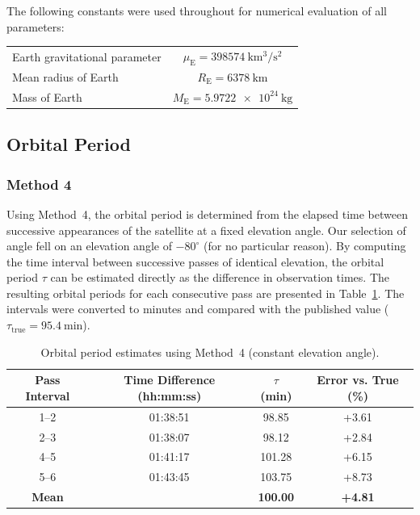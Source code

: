 \documentclass{article}
\begin{document}
The following constants were used throughout for numerical evaluation of all parameters:

\begin{center}
    \vspace{0.5em}
    
    \begin{tabular}{l c}
        Earth gravitational parameter & $\mu_{\text{E}} = \SI{398574}{\kilo\meter^3\per\second^2}$ \\[0.3em]
        Mean radius of Earth & $R_{\text{E}} = \SI{6378}{\kilo\meter}$ \\[0.3em]
        Mass of Earth & $M_{\text{E}} = \SI{5.9722e24}{\kilogram}$ \\[0.3em]
    \end{tabular}
\end{center}

\subsection{Orbital Period}

\subsubsection{Method 4}

Using Method~4, the orbital period is determined from the elapsed time between successive appearances of the satellite at a fixed elevation angle. Our selection of angle fell on an elevation angle of $-80^{\circ}$ (for no particular reason). By computing the time interval between successive passes of identical elevation, the orbital period $\tau$ can be estimated directly as the difference in observation times. The resulting orbital periods for each consecutive pass are presented in Table~\ref{tab:method4_periods}. The intervals were converted to minutes and compared with the published value ($\tau_{\text{true}} = \SI{95.4}{\minute}$).

\begin{table}[H]
    \centering
    \caption{Orbital period estimates using Method~4 (constant elevation angle).}
    \label{tab:method4_periods}
    \renewcommand{\arraystretch}{1.2}
    \begin{tabular}{|c|c|c|c|}
        \hline
        \textbf{Pass Interval} & \textbf{Time Difference (hh:mm:ss)} & \textbf{$\tau$ (\si{\minute})} & \textbf{Error vs. True (\%)} \\ \hline
        1–2 & 01:38:51 & 98.85 & +3.61 \\ \hline
        2–3 & 01:38:07 & 98.12 & +2.84 \\ \hline
        4–5 & 01:41:17 & 101.28 & +6.15 \\ \hline
        5–6 & 01:43:45 & 103.75 & +8.73 \\ \hline
        \textbf{Mean} &  & \textbf{100.00} & \textbf{+4.81} \\ \hline
    \end{tabular}
\end{table}
\end{document}
